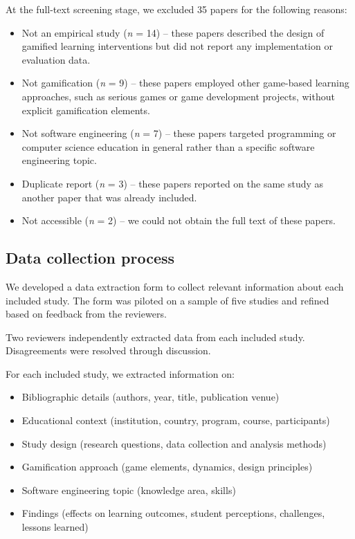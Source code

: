 \documentclass[
	hf,
	]{ceurart}
\begin{document}
		At the full-text screening stage, we excluded 35 papers for the following reasons:
		\begin{itemize}
			\item Not an empirical study (\textit{n} = 14) -- these papers described the design of gamified learning interventions but did not report any implementation or evaluation data.
			\item Not gamification (\textit{n} = 9) -- these papers employed other game-based learning approaches, such as serious games or game development projects, without explicit gamification elements.  
			\item Not software engineering (\textit{n} = 7) -- these papers targeted programming or computer science education in general rather than a specific software engineering topic.
			\item Duplicate report (\textit{n} = 3) -- these papers reported on the same study as another paper that was already included.
			\item Not accessible (\textit{n} = 2) -- we could not obtain the full text of these papers.
		\end{itemize}
		
		\subsection{Data collection process}
		
		We developed a data extraction form to collect relevant information about each included study. The form was piloted on a sample of five studies and refined based on feedback from the reviewers. 
		
		Two reviewers independently extracted data from each included study. Disagreements were resolved through discussion. 
		
		
		For each included study, we extracted information on:
		
		\begin{itemize}
			\item Bibliographic details (authors, year, title, publication venue)
			\item Educational context (institution, country, program, course, participants) 
			\item Study design (research questions, data collection and analysis methods)
			\item Gamification approach (game elements, dynamics, design principles)
			\item Software engineering topic (knowledge area, skills)
			\item Findings (effects on learning outcomes, student perceptions, challenges, lessons learned)
		\end{itemize}
		
\end{document}
